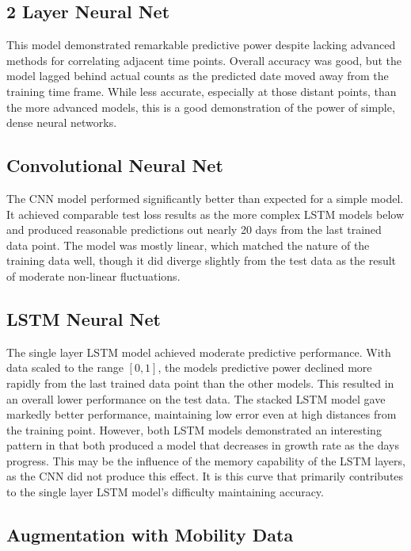 ﻿\documentclass{article}
\begin{document}
\begin{multicols}{2}
  \subsection*{2 Layer Neural Net}
  This model demonstrated remarkable predictive power despite lacking advanced
  methods for correlating adjacent time points.
  Overall accuracy was good, but the model lagged behind actual counts as the
  predicted date moved away from the training time frame.
  While less accurate, especially at those distant points, than the more
  advanced models, this is a good demonstration of the power of simple, dense
  neural networks.

\subsection*{Convolutional Neural Net}

The CNN model performed significantly better than expected for a simple model.
It achieved comparable test loss results as the more complex LSTM models below
and produced reasonable predictions out nearly 20 days from the last trained
data point. The model was mostly linear, which matched the nature of the
training data well, though it did diverge slightly from the test data as the
result of moderate non-linear fluctuations.

\subsection*{LSTM Neural Net}

The single layer LSTM model achieved moderate predictive performance.
With data scaled to the range $[0, 1]$, the models predictive power declined
more rapidly from the last trained data point than the other models.
This resulted in an overall lower performance on the test data.
The stacked LSTM model gave markedly better performance,
maintaining low error even at high distances from the training point.
However, both LSTM models demonstrated an interesting pattern in that both
produced a model that decreases in growth rate as the days progress.
This may be the influence of the memory capability of the LSTM layers,
as the CNN did not produce this effect. It is this curve that primarily
contributes to the single layer LSTM model's difficulty maintaining accuracy.

\subsection*{Augmentation with Mobility Data}


\end{multicols}
\end{document}
